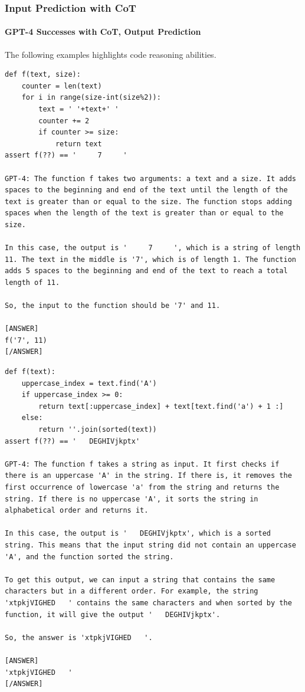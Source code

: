 \subsubsection{Input Prediction with CoT}
\paragraph{GPT-4 Successes with CoT, Output Prediction}

The following examples highlights code reasoning abilities.
\begin{lstlisting}
def f(text, size):
    counter = len(text)
    for i in range(size-int(size%2)):
        text = ' '+text+' '
        counter += 2
        if counter >= size:
            return text
assert f(??) == '     7     '

GPT-4: The function f takes two arguments: a text and a size. It adds spaces to the beginning and end of the text until the length of the text is greater than or equal to the size. The function stops adding spaces when the length of the text is greater than or equal to the size.

In this case, the output is '     7     ', which is a string of length 11. The text in the middle is '7', which is of length 1. The function adds 5 spaces to the beginning and end of the text to reach a total length of 11.

So, the input to the function should be '7' and 11.

[ANSWER]
f('7', 11)
[/ANSWER]
\end{lstlisting}

\begin{lstlisting}
def f(text):
    uppercase_index = text.find('A')
    if uppercase_index >= 0:
        return text[:uppercase_index] + text[text.find('a') + 1 :]
    else:
        return ''.join(sorted(text))
assert f(??) == '   DEGHIVjkptx'

GPT-4: The function f takes a string as input. It first checks if there is an uppercase 'A' in the string. If there is, it removes the first occurrence of lowercase 'a' from the string and returns the string. If there is no uppercase 'A', it sorts the string in alphabetical order and returns it.

In this case, the output is '   DEGHIVjkptx', which is a sorted string. This means that the input string did not contain an uppercase 'A', and the function sorted the string.

To get this output, we can input a string that contains the same characters but in a different order. For example, the string 'xtpkjVIGHED   ' contains the same characters and when sorted by the function, it will give the output '   DEGHIVjkptx'.

So, the answer is 'xtpkjVIGHED   '.

[ANSWER]
'xtpkjVIGHED   '
[/ANSWER]    
\end{lstlisting}

